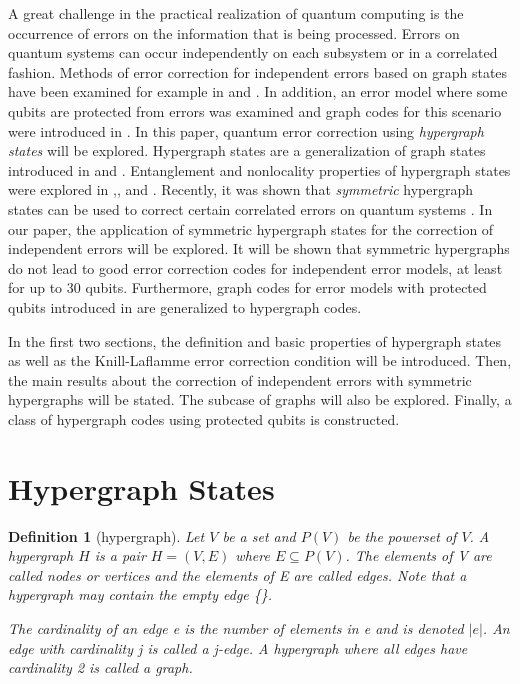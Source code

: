 \documentclass[12pt]{iopart}
\newtheorem{definition}[lemma]{Definition}
\begin{document}
A great challenge in the practical realization of quantum computing is the occurrence of errors on the information that is being processed. Errors on quantum systems can occur independently on each subsystem or in a correlated fashion.
Methods of error correction for independent errors based on graph states have been examined for example in \cite{Schlingemann} and \cite{qditEcc}. In addition, an error model where some qubits are protected from errors was examined and graph codes for this scenario were introduced in \cite{EAQECC}.
In this paper, quantum error correction using \textit{hypergraph states} will be explored. Hypergraph states are a generalization of graph states  introduced in \cite{BP1} and \cite{HypergraphStatesChinese}. Entanglement and nonlocality properties of hypergraph states were explored in \cite{BP2},\cite{ViolationOfLocalRealismInHypergraphStates}, \cite{UnitaryTransformsOfHypergraphStates} and \cite{LocalUnitarySymmetriesOfHypergraphStates}.
Recently, it was shown that \textit{symmetric} hypergraph states can be used to correct certain correlated errors on quantum systems \cite{lyon}. In our paper, the application of symmetric hypergraph states for the correction of independent errors will be explored. It will be shown that symmetric hypergraphs do not lead to good error correction codes for independent error models, at least for up to 30 qubits. Furthermore, graph codes for error models with protected qubits introduced in \cite{EAQECC} are generalized to hypergraph codes.

In the first two sections, the definition and basic properties of hypergraph states as well as the Knill-Laflamme error correction condition will be introduced. Then, the main results about the correction of independent errors with symmetric hypergraphs will be stated. The subcase of graphs will also be explored. Finally, a class of hypergraph codes using protected qubits is constructed. 

\section{Hypergraph States}

\begin{definition}[hypergraph]
Let $V$ be a set and $P(V)$ be the powerset of $V$. A hypergraph $H$ is a pair $H=(V,E)$ where $E \subseteq P(V)$. The elements of V are called nodes or vertices and the elements of E are called edges. Note that a hypergraph may contain the empty edge \{\}.

The cardinality of an edge e is the number of elements in e and is denoted $|e|$. 
An edge with cardinality j is called a j-edge.
A hypergraph where all edges have cardinality 2 is called a graph.
\end{definition}
\end{document}
